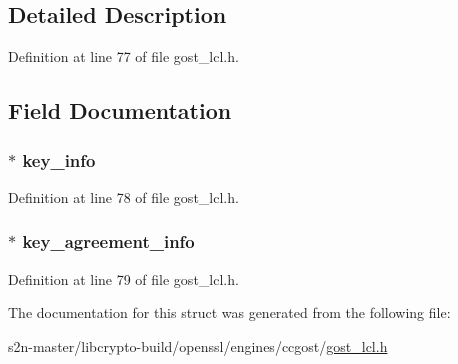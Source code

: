 \subsection{Detailed Description}


Definition at line 77 of file gost\+\_\+lcl.\+h.



\subsection{Field Documentation}
\subsubsection[{\texorpdfstring{key\+\_\+info}{key_info}}]{$\ast$ key\+\_\+info}\hypertarget{struct_g_o_s_t___k_e_y___t_r_a_n_s_p_o_r_t_a77322f4fa4c842f601d7cbf9125a7cb3}{}\label{struct_g_o_s_t___k_e_y___t_r_a_n_s_p_o_r_t_a77322f4fa4c842f601d7cbf9125a7cb3}


Definition at line 78 of file gost\+\_\+lcl.\+h.

\subsubsection[{\texorpdfstring{key\+\_\+agreement\+\_\+info}{key_agreement_info}}]{$\ast$ key\+\_\+agreement\+\_\+info}\hypertarget{struct_g_o_s_t___k_e_y___t_r_a_n_s_p_o_r_t_a781a63e166cf9414fd73bf6948736716}{}\label{struct_g_o_s_t___k_e_y___t_r_a_n_s_p_o_r_t_a781a63e166cf9414fd73bf6948736716}


Definition at line 79 of file gost\+\_\+lcl.\+h.



The documentation for this struct was generated from the following file\+:\begin{DoxyCompactItemize}
\item 
s2n-\/master/libcrypto-\/build/openssl/engines/ccgost/\hyperlink{gost__lcl_8h}{gost\+\_\+lcl.\+h}\end{DoxyCompactItemize}
